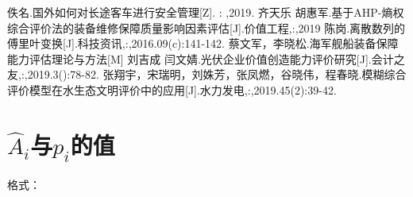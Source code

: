 \documentclass[bwprint]{cumcmthesis}
\begin{document}
    \newpage
    \begin{thebibliography}{9}
         佚名.国外如何对长途客车进行安全管理[Z]. : ,2019.
         齐天乐 胡惠军.基于AHP-熵权综合评价法的装备维修保障质量影响因素评估[J].价值工程,:,2019
         陈岗.离散数列的傅里叶变换[J].科技资讯,:,2016.09(c):141-142.
         蔡文军，李晓松.海军舰船装备保障能力评估理论与方法[M]
         刘吉成 闫文婧.光伏企业价值创造能力评价研究[J].会计之友,:,2019.3():78-82.
        张翔宇，宋瑞明，刘姝芳，张凤燃，谷晓伟，程春晓.模糊综合评价模型在水生态文明评价中的应用[J].水力发电,:,2019.45(2):39-42.
       
    \end{thebibliography}
    \newpage
    \appendix
        \section{$\widehat{A}_i$与$p_i$的值}
        格式：
\end{document}
